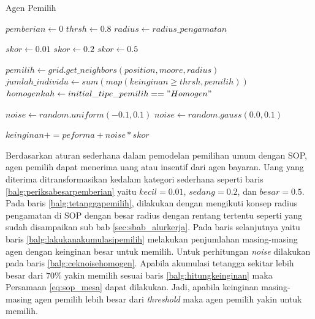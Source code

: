 \begin{algorithm}[H]
	\caption{Agen Pemilih}\label{alg:agenpemilih}
	\begin{algorithmic}[1]
			\State $pemberian \gets 0$
			\State $thrsh \gets 0.8$
			\State $radius \gets radius\_pengamatan$

			\label{balg:periksabesarpemberian}
				\State $skor \gets 0.01$
				\State $skor \gets 0.2$
			\Else
					\State $skor \gets 0.5$
			\EndIf

				\State $pemilih \gets grid.get\_neighbors(position, moore, radius)$\label{balg:tetanggapemilih}
				\State $jumlah\_individu \gets sum(map(keinginan \geq thrsh,pemilih))$\label{balg:lakukanakumulasipemilih}
				\State $homogenkah \gets initial\_tipe\_pemilih == "Homogen"$

				\label{balg:ceknoisehomogen}
					\State $noise \gets random.uniform(-0.1, 0.1)$
				\Else
					\State $noise \gets random.gauss(0.0, 0.1)$
				\EndIf

				\label{balg:hitungkeinginan}
					\State $keinginan += peforma + noise * skor$
				\EndIf
			\EndWhile
		\EndProcedure
	\end{algorithmic}
\end{algorithm}

Berdasarkan aturan sederhana dalam pemodelan pemilihan umum dengan SOP, agen pemilih dapat menerima uang atau insentif dari agen bayaran. Uang yang diterima ditransformasikan kedalam kategori sederhana seperti baris \ref{balg:periksabesarpemberian} yaitu $kecil=0.01$, $sedang=0.2$, dan $besar=0.5$. Pada baris \ref{balg:tetanggapemilih}, dilakukan dengan mengikuti konsep radius pengamatan di SOP dengan besar radius dengan rentang tertentu seperti yang sudah disampaikan sub bab \ref{sec:sbab_alurkerja}. Pada baris selanjutnya yaitu baris \ref{balg:lakukanakumulasipemilih} melakukan penjumlahan masing-masing agen dengan keinginan besar untuk memilih. Untuk perhitungan \textit{noise} dilakukan pada baris \ref{balg:ceknoisehomogen}. Apabila akumulasi tetangga sekitar lebih besar dari $70\%$ yakin memilih sesuai baris \ref{balg:hitungkeinginan} maka Persamaan \ref{eq:sop_mesa} dapat dilakukan. Jadi, apabila keinginan masing-masing agen pemilih lebih besar dari \textit{threshold} maka agen pemilih yakin untuk memilih.
